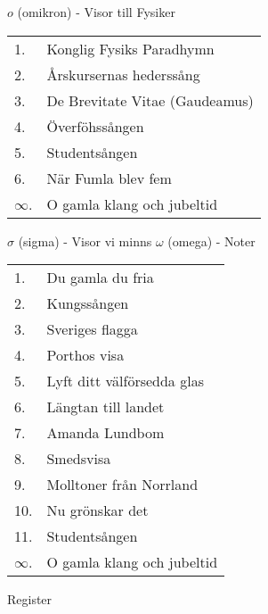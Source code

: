 \documentclass[a6paper,10pt]{article}
\begin{document}
\noindent
\Large $o$ (omikron) - Visor till Fysiker
\vspace{-5pt}
\begin{table}[!h]
\begin{tabularx}{1\textwidth}{l X}
1.&Konglig Fysiks Paradhymn\\
2.&Årskursernas hederssång\\
3.&De Brevitate Vitae (Gaudeamus)\\
4.&Överföhssången\\
5.&Studentsången\\
6.&När Fumla blev fem\\
$\infty$.&O gamla klang och jubeltid
\end{tabularx}
\end{table}

\noindent
\Large $\sigma$ (sigma) - Visor vi minns
\newpage
\noindent
\Large $\omega$ (omega) - Noter
\vspace{-5pt}
\begin{table}[!h]
\begin{tabularx}{1\textwidth}{l X}
1.&Du gamla du fria\\
2.&Kungssången\\
3.&Sveriges flagga\\
4.&Porthos visa\\
5.&Lyft ditt välförsedda glas\\
6.&Längtan till landet\\
7.&Amanda Lundbom\\
8.&Smedsvisa\\
9.&Molltoner från Norrland\\
10.&Nu grönskar det\\
11.&Studentsången\\
$\infty$.&O gamla klang och jubeltid
\end{tabularx}
\end{table}

\noindent
\Large Register
\end{document}
